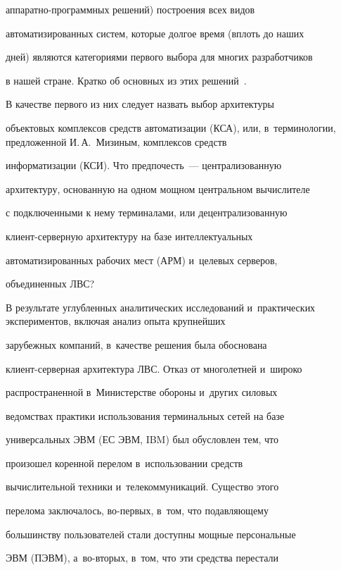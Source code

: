      ап\-па\-рат\-но-про\-грам\-мных решений) построения всех видов


автоматизированных систем, которые долгое время (вплоть до наших


дней) являются категориями первого выбора для многих разработчиков


в нашей стране. Кратко об основных из этих решений~\cite{8-miz}.





     В качестве первого из них следует назвать выбор архитектуры


объектовых комплексов средств автоматизации (КСА), или, в~терминологии, предложенной И.\,А.~Мизиным, комплексов средств


информатизации (КСИ). Что предпочесть~--- централизованную


архитектуру, основанную на одном мощном центральном вычислителе


с подключенными к нему терминалами, или децентрализованную


     кли\-ент-сер\-вер\-ную архитектуру на базе интеллектуальных


автоматизированных рабочих мест (АРМ) и~целевых серверов,


объединенных ЛВС?





     В результате углубленных аналитических исследований и~практических экспериментов, включая анализ опыта крупнейших


зарубежных компаний, в~качестве решения была обоснована


кли\-ент-сер\-вер\-ная архитектура ЛВС. Отказ от многолетней и~широко


распространенной в~Министерстве обороны и~других силовых


ведомствах практики использования терминальных сетей на базе


универсальных ЭВМ (ЕС ЭВМ, IBM) был обусловлен тем, что


произошел коренной перелом в~использовании средств


вычислительной техники и~телекоммуникаций. Существо этого


перелома заключалось, во-пер\-вых, в~том, что подавляющему


большинству пользователей стали доступны мощные персональные


ЭВМ (ПЭВМ), а~во-вто\-рых, в~том, что эти средства перестали


